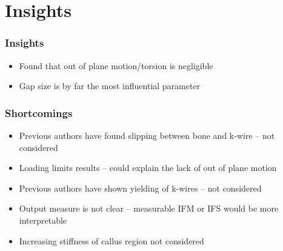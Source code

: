 \documentclass[aspectratio=169,xcolor={svgnames,table},10pt,fleqn]{beamer}
\begin{document}
\section{Insights}

  \begin{frame}
    \frametitle{Insights}
    \begin{itemize}
      \item Found that out of plane motion/torsion is negligible
      \item Gap size is by far the most influential parameter
    \end{itemize}
  \end{frame}

  \begin{frame}
    \frametitle{Shortcomings}
    \begin{itemize}
      \item Previous authors have found slipping between bone and k-wire -- not considered
      \item Loading limits results -- could explain the lack of out of plane motion
      \item Previous authors have shown yielding of k-wires -- not considered
      \item Output measure is not clear -- measurable IFM or IFS would be more interpretable
      \item Increasing stiffness of callus region not considered
    \end{itemize}
  \end{frame}
\end{document}
